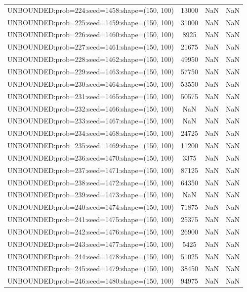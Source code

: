 \begin{longtable}{lccc}
UNBOUNDED:prob=224:seed=1458:shape=(150, 100) & 13000 &   NaN &    NaN \\
UNBOUNDED:prob=225:seed=1459:shape=(150, 100) & 31000 &   NaN &    NaN \\
UNBOUNDED:prob=226:seed=1460:shape=(150, 100) &  8925 &   NaN &    NaN \\
UNBOUNDED:prob=227:seed=1461:shape=(150, 100) & 21675 &   NaN &    NaN \\
UNBOUNDED:prob=228:seed=1462:shape=(150, 100) & 49950 &   NaN &    NaN \\
UNBOUNDED:prob=229:seed=1463:shape=(150, 100) & 57750 &   NaN &    NaN \\
UNBOUNDED:prob=230:seed=1464:shape=(150, 100) & 53550 &   NaN &    NaN \\
UNBOUNDED:prob=231:seed=1465:shape=(150, 100) & 50575 &   NaN &    NaN \\
UNBOUNDED:prob=232:seed=1466:shape=(150, 100) &   NaN &   NaN &    NaN \\
UNBOUNDED:prob=233:seed=1467:shape=(150, 100) &   NaN &   NaN &    NaN \\
UNBOUNDED:prob=234:seed=1468:shape=(150, 100) & 24725 &   NaN &    NaN \\
UNBOUNDED:prob=235:seed=1469:shape=(150, 100) & 11200 &   NaN &    NaN \\
UNBOUNDED:prob=236:seed=1470:shape=(150, 100) &  3375 &   NaN &    NaN \\
UNBOUNDED:prob=237:seed=1471:shape=(150, 100) & 87125 &   NaN &    NaN \\
UNBOUNDED:prob=238:seed=1472:shape=(150, 100) & 64350 &   NaN &    NaN \\
UNBOUNDED:prob=239:seed=1473:shape=(150, 100) &   NaN &   NaN &    NaN \\
UNBOUNDED:prob=240:seed=1474:shape=(150, 100) & 71875 &   NaN &    NaN \\
UNBOUNDED:prob=241:seed=1475:shape=(150, 100) & 25375 &   NaN &    NaN \\
UNBOUNDED:prob=242:seed=1476:shape=(150, 100) & 26900 &   NaN &    NaN \\
UNBOUNDED:prob=243:seed=1477:shape=(150, 100) &  5425 &   NaN &    NaN \\
UNBOUNDED:prob=244:seed=1478:shape=(150, 100) & 51025 &   NaN &    NaN \\
UNBOUNDED:prob=245:seed=1479:shape=(150, 100) & 38450 &   NaN &    NaN \\
UNBOUNDED:prob=246:seed=1480:shape=(150, 100) & 94975 &   NaN &    NaN \\

\end{longtable}
